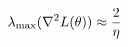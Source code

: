 \documentclass[preview]{standalone}
\begin{document}
\begin{align*}
\special{dvisvgm:raw <g id='unique000'>}\lambda_{\max}(\nabla^2 L(\theta)) \approx \frac{2}{\eta}\special{dvisvgm:raw </g>}
\end{align*}
\end{document}
